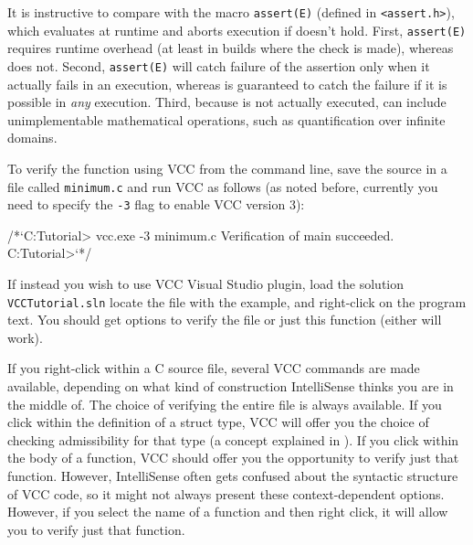 \begin{note}
It is instructive to compare  with the macro
\lstinline|assert(E)| (defined in \lstinline|<assert.h>|), which
evaluates   at runtime and aborts execution if 
doesn't hold. First, \lstinline|assert(E)| requires runtime overhead (at least
in builds where the check is made), whereas  does
not. Second, \lstinline|assert(E)| will catch failure of the 
assertion only when it actually fails in an execution, whereas 
 is guaranteed to catch the failure if it is
possible in \emph{any} execution. Third, because
 is not actually executed,  can include
unimplementable mathematical operations, such as
quantification over infinite domains.
\end{note}

To verify the function using VCC from the command line, save the source in a file called \lstinline|minimum.c|
and run VCC as follows (as noted before, currently you need to specify the \lstinline|-3| flag to enable
VCC version 3):

\begin{VCC}
/*`C:\Somewhere\VCC Tutorial> vcc.exe -3 minimum.c
Verification of main succeeded.
C:\Somewhere\VCC Tutorial>`*/
\end{VCC}


If instead you wish to use VCC Visual Studio plugin, load the solution \lstinline|VCCTutorial.sln|
locate the file with the example, and right-click on the program text.
You should get options to verify the file or just this function (either will work).

If you right-click within a C source file,
several VCC commands are made available, depending on what kind of
construction IntelliSense thinks you are in the middle of. The choice
of verifying the entire file is always available. If you click within
the definition of a struct type, VCC will offer you the choice of
checking admissibility for that type (a concept explained in ).
If you click within the body of a function, VCC should offer
you the opportunity to verify just that function. However,
IntelliSense often gets confused about the syntactic structure of
VCC code, so it might not always present these context-dependent
options. However, if you select the name of a function and then right
click, it will allow you to verify just that function.

